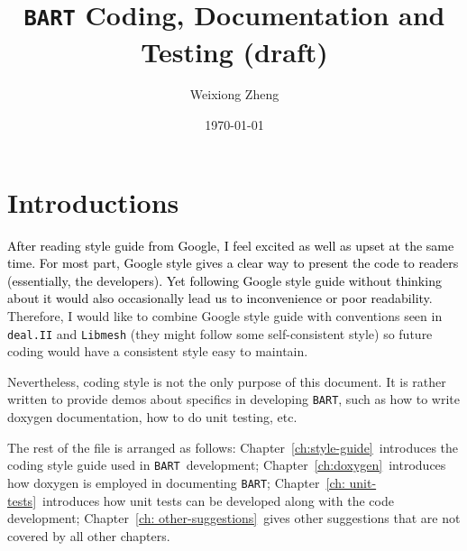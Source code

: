 \documentclass[openany]{book}
\title{{\tt BART} Coding, Documentation and Testing (draft)} %
\author{Weixiong Zheng} %
\date{\today} %
\newcommand{\bart}{{\tt BART}}
\begin{document}
\maketitle %
\tableofcontents
\chapter{Introductions}
\textcolor{black}{After reading style guide from Google, I feel excited as well as upset at the same time. For most part, Google style gives a clear way to present the code to readers (essentially, the developers). Yet following Google style guide without thinking about it would also occasionally lead us to inconvenience or poor readability}. Therefore, I would like to combine Google style guide with conventions seen in {\tt deal.II} and {\tt Libmesh} (they might follow some self-consistent style) so future coding would have a consistent style easy to maintain.

Nevertheless, coding style is not the only purpose of this document. It is rather written to provide demos about specifics in developing \bart, such as how to write doxygen documentation, how to do unit testing, etc.

The rest of the file is arranged as follows: Chapter\ \ref{ch:style-guide}\ introduces the coding style guide used in \bart\ development; Chapter\ \ref{ch:doxygen}\ introduces how doxygen is employed in documenting \bart; Chapter\ \ref{ch: unit-tests}\ introduces how unit tests can be developed along with the code development; Chapter\ \ref{ch: other-suggestions}\ gives other suggestions that are not covered by all other chapters.
\end{document}
